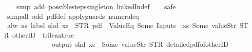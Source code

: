 \begin{isabellebody}
%
\isadelimproof
\ \ %
\endisadelimproof
%
\isatagproof
{}\isamarkupfalse%
\ {\isacharparenleft}simp\ add{\isacharcolon}\ possible{\isacharunderscore}steps{\isacharunderscore}singleton\ linkedIn{\isacharunderscore}def{\isacharparenright}\isanewline
\ \ \isamarkupfalse%
\ safe\isanewline
\ \ \isamarkupfalse%
\ {\isacharparenleft}simp{\isacharunderscore}all\ add{\isacharcolon}\ pdf{}{\isacharunderscore}def\ apply{\isacharunderscore}guards\ numeral{\isacharunderscore}{}{\isacharunderscore}eq{\isacharunderscore}{}{\isacharparenright}%
\endisatagproof
{\isafoldproof}%
%
\isadelimproof
%
\endisadelimproof
%
\isamarkupfalse%
\ {\isachardoublequoteopen}alw\ {\isacharparenleft}{\isasymlambda}xs{\isachardot}\ label\ {\isacharparenleft}shd\ xs{\isacharparenright}\ {\isacharequal}\ STR\ {\isacharprime}{\isacharprime}pdf{\isacharprime}{\isacharprime}\ {\isasymand}\ ValueEq\ {\isacharparenleft}Some\ {\isacharparenleft}Inputs\ {}\ xs{\isacharparenright}{\isacharparenright}\ {\isacharparenleft}Some\ {\isacharparenleft}value{\isachardot}Str\ STR\ {\isacharprime}{\isacharprime}otherID{\isacharprime}{\isacharprime}{\isacharparenright}{\isacharparenright}\ {\isacharequal}\ trilean{\isachardot}true\ {\isasymlongrightarrow}\isanewline
\ \ \ \ \ \ \ \ \ \ \ \ \ \ output\ {\isacharparenleft}shd\ xs{\isacharparenright}\ {\isasymnoteq}\ {\isacharbrackleft}Some\ {\isacharparenleft}value{\isachardot}Str\ STR\ {\isacharprime}{\isacharprime}detailed{\isacharunderscore}pdf{\isacharunderscore}of{\isacharunderscore}otherID{\isacharprime}{\isacharprime}{\isacharparenright}{\isacharbrackright}{\isacharparenright}\isanewline

\end{isabellebody}
